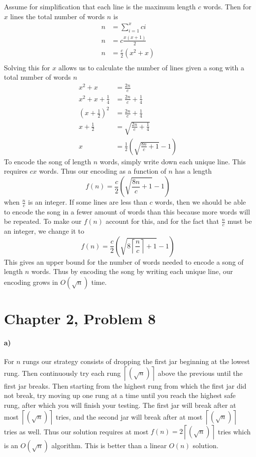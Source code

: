 \documentclass[12pt]{article}
\begin{document}
Assume for simplification that each line is the maximum length \(c\) words. Then for \(x\) lines the total number of words \(n\) is
\begin{align*}
        n&=\sum_{i=1}^x ci\\
        n&=c\frac{x(x+1)}{2}\\
        n&=\frac{c}{2}(x^2+x)\\
\end{align*}
Solving this for \(x\) allows us to calculate the number of lines given a song with a total number of words \(n\)
\begin{align*}
        x^2+x&=\frac{2n}{c}\\
        x^2+x+\frac{1}{4}&=\frac{2n}{c}+\frac{1}{4}\\
        \left(x+\frac{1}{2}\right)^2&=\frac{2n}{c}+\frac{1}{4}\\
        x+\frac{1}{2}&=\sqrt{\frac{2n}{c}+\frac{1}{4}}\\
        x&=\frac{1}{2}\left(\sqrt{\frac{8n}{c}+1}-1\right)
\end{align*}
To encode the song of length \(n\) words, simply write down each unique line. This requires \(cx\) words. Thus our encoding as a function of \(n\)
has a length 
\[f(n)=\frac{c}{2}\left(\sqrt{\frac{8n}{c}+1}-1\right)\]
when \(\frac{n}{c}\) is an integer. If some lines are less than \(c\) words, then we should be able to encode the song in a fewer amount of words than
this because more words will be repeated. To make our \(f(n)\) account for this, and for the fact that \(\frac{n}{c}\) must be an integer, we change it to
\[f(n)=\frac{c}{2}\left(\sqrt{8\left\lceil\frac{n}{c}\right\rceil+1}-1\right)\]
This gives an upper bound for the number of words needed to encode a song of length \(n\) words. Thus by encoding the song by writing each unique line, our
encoding grows in \(O\left(\sqrt{n}\right)\) time.

\section*{Chapter 2, Problem 8}

\paragraph{a)}
For \(n\) rungs our strategy consists of dropping the first jar beginning at the lowest rung. Then continuously try each rung
\(\left\lceil(\sqrt{n})\right\rceil\) above the previous until the first jar breaks. Then starting from the highest rung from which the first jar did not break,
try moving up one rung at a time until you reach the highest safe rung, after which you will finish your testing. The first jar will break after at most
\(\left\lceil(\sqrt{n})\right\rceil\) tries, and the second jar will break after at most \(\left\lceil(\sqrt{n})\right\rceil\) tries as well.
Thus our solution requires at most \(f(n)=2\left\lceil(\sqrt{n})\right\rceil\) tries which is an \(O\left(\sqrt{n}\right)\) algorithm. This is better than a linear
\(O(n)\) solution.
\end{document}
